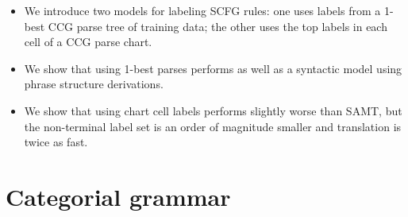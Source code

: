 \documentclass[a4paper]{article}
\begin{document}
%
%
\begin{itemize}
\item We introduce two models for labeling SCFG rules: one uses labels from a 1-best CCG parse tree of training data; the other uses the top labels in each cell of a CCG parse chart.
\item We show that using 1-best parses performs as well as a syntactic model using phrase structure derivations.
\item We show that using chart cell labels performs slightly worse than SAMT, but the non-terminal label set is an order of magnitude smaller and translation is twice as fast.
\end{itemize}

\section{Categorial grammar}
\label{sec:cg}





\end{document}
